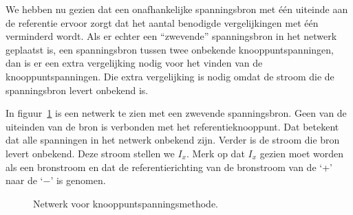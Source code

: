 We hebben nu gezien dat een onafhankelijke spanningsbron met één uiteinde aan de referentie ervoor zorgt dat het aantal benodigde vergelijkingen met één verminderd wordt. Als er echter een ``zwevende'' spanningsbron in het netwerk geplaatst is, een spanningsbron tussen twee onbekende knooppuntspanningen, dan is er een extra vergelijking nodig voor het vinden van de knooppuntspanningen. Die extra vergelijking is nodig omdat de stroom die de spanningsbron levert onbekend is.

In figuur~\ref{fig:gelnetwerkvoornodalanalysis6} is een netwerk te zien met een zwevende spanningsbron. Geen van de uiteinden van de bron is verbonden met het referentieknooppunt. Dat betekent dat alle spanningen in het netwerk onbekend zijn. Verder is de stroom die bron levert onbekend. Deze stroom stellen we $I_x$. Merk op dat $I_x$ gezien moet worden als een bronstroom en dat de referentierichting van de bronstroom van de `+' naar de `$-$' is genomen.

\begin{figure}[!ht]
\centering
{}
\caption{Netwerk voor knooppuntspanningsmethode.}
\label{fig:gelnetwerkvoornodalanalysis6}
\end{figure}

